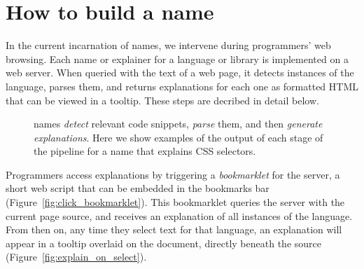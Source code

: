 \section{How to build a \gls{name}}



In the current incarnation of \glspl{name}, we intervene during programmers' web browsing.
Each \gls{name} or explainer for a language or library is implemented on a web server.
When queried with the text of a web page, it detects instances of the language, parses them, and returns explanations for each one as formatted HTML that can be viewed in a tooltip.
These steps are decribed in detail below.

\begin{figure}
\caption{\Glspl{name} \emph{detect} relevant code snippets, \emph{parse} them, and then \emph{generate explanations}.  Here we show examples of the output of each stage of the pipeline for a \gls{name} that explains CSS selectors.}
\label{fig:explanation_pipeline}
\end{figure}

Programmers access explanations by triggering a \emph{bookmarklet} for the server, a short web script that can be embedded in the bookmarks bar (Figure~\ref{fig:click_bookmarklet}).
This bookmarklet queries the server with the current page source, and receives an explanation of all instances of the language.
From then on, any time they select text for that language, an explanation will appear in a tooltip overlaid on the document, directly beneath the source (Figure~\ref{fig:explain_on_select}).   

